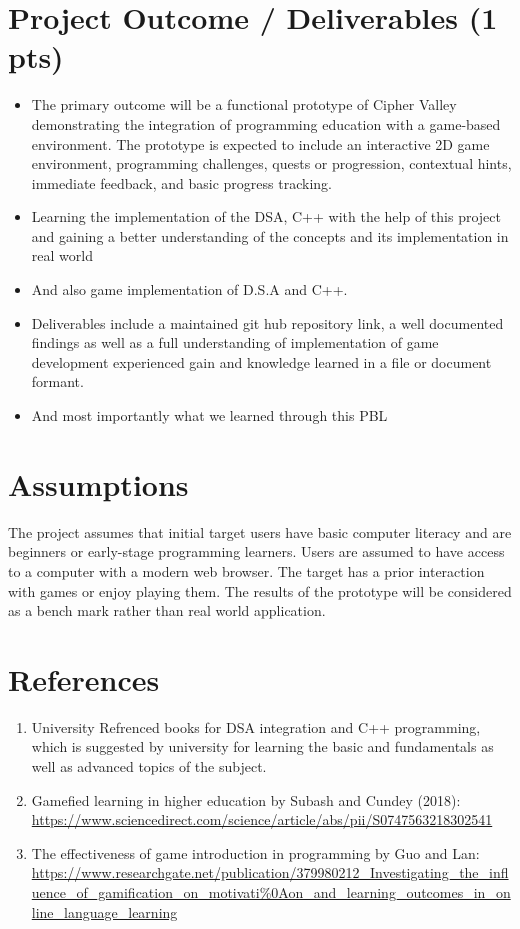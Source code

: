\documentclass[12pt,a4paper]{article}
\begin{document}
\section*{Project Outcome / Deliverables (1 pts)}
\begin{itemize}
\item The primary outcome will be a functional prototype of Cipher Valley demonstrating the integration of programming education with a game-based environment. The prototype is expected to include an interactive 2D game environment, programming challenges, quests or progression, contextual hints, immediate feedback, and basic progress tracking.
\item Learning the implementation of the DSA, C++ with the help of this project and gaining a better understanding of the concepts and its implementation in real world
\item And also game implementation of D.S.A and C++.
\item Deliverables include a maintained git hub repository link, a well documented findings as well as a full understanding of implementation of game development experienced gain and knowledge learned in a file or document formant.
\item And most importantly what we learned through this PBL
\end{itemize}

\section*{Assumptions}
The project assumes that initial target users have basic computer literacy and are beginners or early-stage programming learners. Users are assumed to have access to a computer with a modern web browser. The target has a prior interaction with games or enjoy playing them. The results of the prototype will be considered as a bench mark rather than real world application.

\section*{References}
\begin{enumerate}
\item University Refrenced books for DSA integration and C++ programming, which is suggested by university for learning the basic and fundamentals as well as advanced topics of the subject.
\item Gamefied learning in higher education by Subash and Cundey (2018):\\
\url{https://www.sciencedirect.com/science/article/abs/pii/S0747563218302541}
\item The effectiveness of game introduction in programming by Guo and Lan:\\
\url{https://www.researchgate.net/publication/379980212_Investigating_the_influence_of_gamification_on_motivati\%0Aon_and_learning_outcomes_in_online_language_learning}
\end{enumerate}
\end{document}

